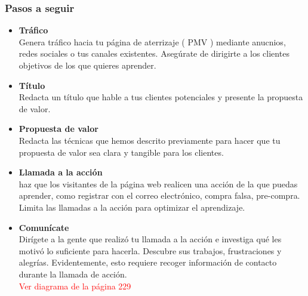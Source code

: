 \documentclass[11pt]{book}
\begin{document}
\subsubsection{Pasos a seguir}
\begin{itemize}
\item \textbf{ Tráfico }\\
Genera tráfico hacia tu página de aterrizaje ( PMV ) mediante anucnios, redes sociales o tus canales existentes. Asegúrate de dirigirte a los clientes objetivos de los que quieres aprender.
\item \textbf{ Título }\\
Redacta un título que hable a tus clientes potenciales y presente la propuesta de valor.
\item \textbf{ Propuesta de valor }\\
Redacta las técnicas que hemos descrito previamente para hacer que tu propuesta de valor sea clara y tangible para los clientes.
\item \textbf{ Llamada a la acción }\\
haz que los visitantes de la página web realicen una acción de la que puedas aprender, como registrar con el correo electrónico, compra falsa, pre-compra. Limita las llamadas a la acción para optimizar el aprendizaje.
\item \textbf{ Comunícate }\\
Dirígete a la gente que realizó tu llamada a la acción e investiga qué les motivó lo suficiente para hacerla. Descubre sus trabajos, frustraciones y alegrías. Evidentemente, esto requiere recoger información de contacto durante la llamada de acción.\\
\textcolor{red}{Ver diagrama de la página 229 }
\end{itemize}
\end{document}
